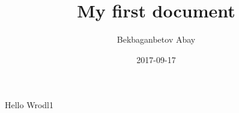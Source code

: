 \documentclass{article}
\title{My first document}
\date{2017-09-17}
\author{Bekbaganbetov Abay}
\begin{document}
  \maketitle
  \newpage
  
Hello Wrodl1
\end{document}
